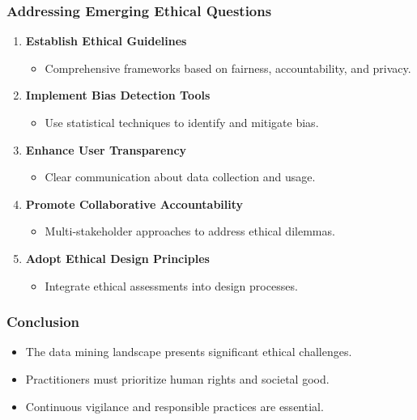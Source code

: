 \documentclass[aspectratio=169]{beamer}
\begin{document}
\begin{frame}[fragile]
  \frametitle{Addressing Emerging Ethical Questions}
  \begin{enumerate}
    \item \textbf{Establish Ethical Guidelines}
      \begin{itemize}
        \item Comprehensive frameworks based on fairness, accountability, and privacy.
      \end{itemize}
      
    \item \textbf{Implement Bias Detection Tools}
      \begin{itemize}
        \item Use statistical techniques to identify and mitigate bias.
      \end{itemize}
      
    \item \textbf{Enhance User Transparency}
      \begin{itemize}
        \item Clear communication about data collection and usage.
      \end{itemize}
      
    \item \textbf{Promote Collaborative Accountability}
      \begin{itemize}
        \item Multi-stakeholder approaches to address ethical dilemmas.
      \end{itemize}
      
    \item \textbf{Adopt Ethical Design Principles}
      \begin{itemize}
        \item Integrate ethical assessments into design processes.
      \end{itemize}
  \end{enumerate}
\end{frame}

\begin{frame}[fragile]
  \frametitle{Conclusion}
  \begin{itemize}
    \item The data mining landscape presents significant ethical challenges.
    \item Practitioners must prioritize human rights and societal good.
    \item Continuous vigilance and responsible practices are essential.
  \end{itemize}
\end{frame}
\end{document}
